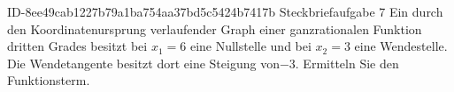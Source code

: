 \begin{exercise}
      {ID-8ee49cab1227b79a1ba754aa37bd5c5424b7417b}
      {Steckbriefaufgabe 7}
  \ifproblem\problem
    Ein durch den Koordinatenursprung verlaufender Graph einer ganzrationalen
    Funktion dritten Grades besitzt bei $x_1=\num{6}$ eine Nullstelle und bei
    $x_2=\num{3}$ eine Wendestelle. Die Wendetangente besitzt dort eine
    Steigung von\num{-3}. Ermitteln Sie den Funktionsterm.
  \fi
\end{exercise}
